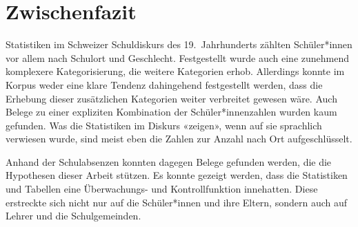 \section{Zwischenfazit}
Statistiken im Schweizer Schuldiskurs des 19.~Jahrhunderts zählten Schüler*innen vor allem nach Schulort und Geschlecht. Festgestellt wurde auch eine zunehmend komplexere Kategorisierung, die weitere Kategorien erhob. Allerdings konnte im Korpus weder eine klare Tendenz dahingehend festgestellt werden, dass die Erhebung dieser zusätzlichen Kategorien weiter verbreitet gewesen wäre. Auch Belege zu einer expliziten Kombination der Schüler*innenzahlen wurden kaum gefunden. Was die Statistiken im Diskurs «zeigen», wenn auf sie sprachlich verwiesen wurde, sind meist eben die Zahlen zur Anzahl nach Ort aufgeschlüsselt.

Anhand der Schulabsenzen konnten dagegen Belege gefunden werden, die die Hypothesen dieser Arbeit stützen. Es konnte gezeigt werden, dass die Statistiken und Tabellen eine Überwachungs- und Kontrollfunktion innehatten. Diese erstreckte sich nicht nur auf die Schüler*innen und ihre Eltern, sondern auch auf Lehrer und die Schulgemeinden. 